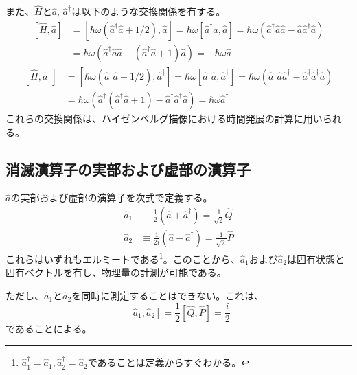 また、$\hat H$と$\hat a$, $\hat a^\dagger$は以下のような交換関係を有する。
\begin{equation}
\begin{aligned}
  \left[\hat H, \hat a\right] &= [\hbar \omega (\hat a^\dagger \hat a + 1/2), \hat a] = \hbar \omega [\hat a^\dagger \hat a, \hat a] = \hbar \omega (\hat a^\dagger \hat a \hat a - \hat a \hat a^\dagger \hat a)\\ 
  &= \hbar \omega (\hat a^\dagger \hat a \hat a - (\hat a^\dagger \hat a + 1) \hat a) = -\hbar\omega \hat a
\end{aligned}
\end{equation}
\begin{equation}
  \begin{aligned}
  	\left[\hat H, \hat a^\dagger \right] &= [\hbar \omega (\hat a^\dagger \hat a + 1/2), \hat a^\dagger] = \hbar \omega [\hat a^\dagger \hat a, \hat a^\dagger] = \hbar \omega (\hat a^\dagger \hat a \hat a^\dagger - \hat a^\dagger \hat a^\dagger \hat a)\\ 
  &= \hbar \omega (\hat a^\dagger (\hat a^\dagger \hat a + 1) - \hat a^\dagger \hat a^\dagger\hat a) = \hbar\omega \hat a^\dagger
  \end{aligned}
\end{equation}
これらの交換関係は、ハイゼンベルグ描像における時間発展の計算に用いられる。

\subsection{消滅演算子の実部および虚部の演算子}
$\hat a$の実部および虚部の演算子を次式で定義する。
\begin{equation}
  \begin{aligned}
  	\hat a_1 &\equiv \frac 1 2 (\hat a + \hat a^\dagger) = \frac 1 {\sqrt 2} \hat Q\\
  	\hat a_2 &\equiv \frac 1 {2i} (\hat a - \hat a^\dagger) = \frac 1 {\sqrt 2} \hat P
  \end{aligned}
\end{equation}
これらはいずれもエルミートである\footnote{$\hat a_1^\dagger = \hat a_1, \hat a_2^\dagger = \hat a_2$であることは定義からすぐわかる。}。このことから、$\hat a_1$および$\hat a_2$は固有状態と固有ベクトルを有し、物理量の計測が可能である。

ただし、$\hat a_1$と$\hat a_2$を同時に測定することはできない。これは、
\begin{equation}
  \left[ \hat a_1, \hat a_2\right] = \frac 1 2 [\hat Q, \hat P] = \frac i 2
\end{equation}
であることによる。


